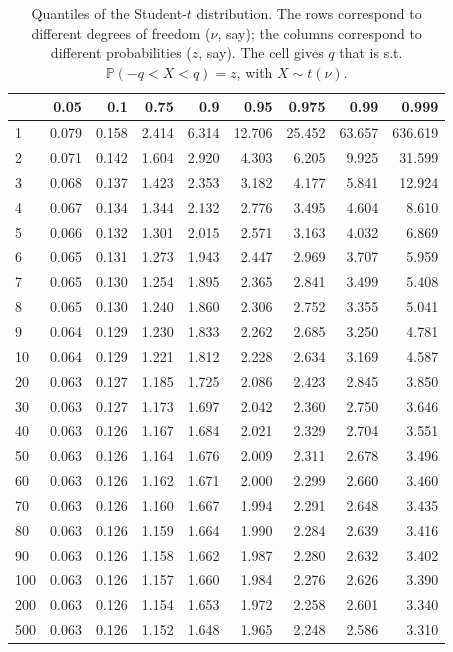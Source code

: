 \documentclass[
  11pt,
]{book}
\theoremstyle{definition}
\theoremstyle{definition}
\theoremstyle{definition}
\theoremstyle{definition}
\theoremstyle{remark}
\begin{document}
\begin{table}

\caption{\label{tab:Student}Quantiles of the Student-$t$ distribution. The rows correspond to different degrees of freedom ($\nu$, say); the columns correspond to different probabilities ($z$, say). The cell gives $q$ that is s.t. $\mathbb{P}(-q<X<q)=z$, with $X \sim t(\nu)$.}
\centering
\begin{tabular}[t]{l|r|r|r|r|r|r|r|r}
\hline
  & 0.05 & 0.1 & 0.75 & 0.9 & 0.95 & 0.975 & 0.99 & 0.999\\
\hline
1 & 0.079 & 0.158 & 2.414 & 6.314 & 12.706 & 25.452 & 63.657 & 636.619\\
\hline
2 & 0.071 & 0.142 & 1.604 & 2.920 & 4.303 & 6.205 & 9.925 & 31.599\\
\hline
3 & 0.068 & 0.137 & 1.423 & 2.353 & 3.182 & 4.177 & 5.841 & 12.924\\
\hline
4 & 0.067 & 0.134 & 1.344 & 2.132 & 2.776 & 3.495 & 4.604 & 8.610\\
\hline
5 & 0.066 & 0.132 & 1.301 & 2.015 & 2.571 & 3.163 & 4.032 & 6.869\\
\hline
6 & 0.065 & 0.131 & 1.273 & 1.943 & 2.447 & 2.969 & 3.707 & 5.959\\
\hline
7 & 0.065 & 0.130 & 1.254 & 1.895 & 2.365 & 2.841 & 3.499 & 5.408\\
\hline
8 & 0.065 & 0.130 & 1.240 & 1.860 & 2.306 & 2.752 & 3.355 & 5.041\\
\hline
9 & 0.064 & 0.129 & 1.230 & 1.833 & 2.262 & 2.685 & 3.250 & 4.781\\
\hline
10 & 0.064 & 0.129 & 1.221 & 1.812 & 2.228 & 2.634 & 3.169 & 4.587\\
\hline
20 & 0.063 & 0.127 & 1.185 & 1.725 & 2.086 & 2.423 & 2.845 & 3.850\\
\hline
30 & 0.063 & 0.127 & 1.173 & 1.697 & 2.042 & 2.360 & 2.750 & 3.646\\
\hline
40 & 0.063 & 0.126 & 1.167 & 1.684 & 2.021 & 2.329 & 2.704 & 3.551\\
\hline
50 & 0.063 & 0.126 & 1.164 & 1.676 & 2.009 & 2.311 & 2.678 & 3.496\\
\hline
60 & 0.063 & 0.126 & 1.162 & 1.671 & 2.000 & 2.299 & 2.660 & 3.460\\
\hline
70 & 0.063 & 0.126 & 1.160 & 1.667 & 1.994 & 2.291 & 2.648 & 3.435\\
\hline
80 & 0.063 & 0.126 & 1.159 & 1.664 & 1.990 & 2.284 & 2.639 & 3.416\\
\hline
90 & 0.063 & 0.126 & 1.158 & 1.662 & 1.987 & 2.280 & 2.632 & 3.402\\
\hline
100 & 0.063 & 0.126 & 1.157 & 1.660 & 1.984 & 2.276 & 2.626 & 3.390\\
\hline
200 & 0.063 & 0.126 & 1.154 & 1.653 & 1.972 & 2.258 & 2.601 & 3.340\\
\hline
500 & 0.063 & 0.126 & 1.152 & 1.648 & 1.965 & 2.248 & 2.586 & 3.310\\
\hline
\end{tabular}
\end{table}
\end{document}

